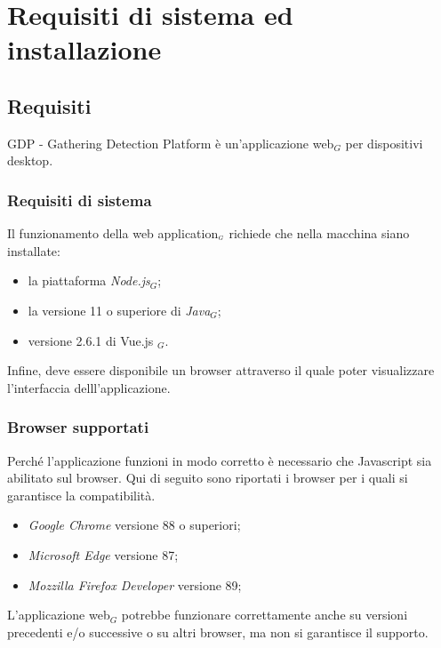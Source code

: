 \chapter{Requisiti di sistema ed installazione}\label{RequisitiDiSistemaEdInstallazione}

\section{Requisiti}\label{RequisitiDiSistemaEdInstallazioneRequisiti}
GDP - Gathering Detection Platform è un'applicazione web$_G$ per dispositivi desktop. 

\subsection{Requisiti di sistema}\label{RequisitiDiSistemaEdInstallazioneRequisitiRequisitiDiSistema}

Il funzionamento della web application$_{\scaleto{G}{3pt}}$ richiede che nella macchina siano installate:
\begin{itemize}
	\item la piattaforma \textit{Node.js}$_G$;
	\item la versione 11 o superiore di \textit{Java}$_G$;
	\item versione 2.6.1 di Vue.js $_G$.
\end{itemize}
Infine, deve essere disponibile un browser attraverso il quale poter visualizzare l'interfaccia delll'applicazione.

\subsection{Browser supportati}\label{RequisitiDiSistemaEdInstallazioneRequisitiBrowserSupportati}
Perché l'applicazione funzioni in modo corretto è necessario che Javascript sia abilitato sul browser. 
Qui di seguito sono riportati i browser per i quali si garantisce la compatibilità. 
\begin{itemize}
	\item \textit{Google Chrome} versione 88 o superiori;
	\item \textit{Microsoft Edge} versione 87;
	\item \textit{Mozzilla Firefox Developer} versione 89;
\end{itemize}
L'applicazione web$_G$ potrebbe funzionare correttamente anche su versioni precedenti e/o successive o su altri browser, ma non si garantisce il supporto. 
 

